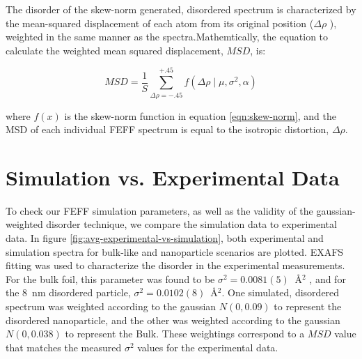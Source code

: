 The disorder of the skew-norm generated, disordered spectrum is characterized by the mean-squared displacement of each atom from its original position ($ \Delta\rho $ ), weighted in the same manner as the spectra.Mathemtically, the equation to calculate the weighted mean squared displacement, $ MSD $, is:

\begin{equation}
	\label{eqn:weighted-MSD}
	MSD  = \frac{1}{S} \sum_{\Delta\rho=-.45}^{+.45} f\left(\Delta \rho \mid \mu, \sigma^2, \alpha \right) 
\end{equation}

\noindent
where $ f(x) $ is the skew-norm function in equation \ref{eqn:skew-norm}, and the MSD of each individual FEFF spectrum is equal to the isotropic distortion, $ \Delta\rho $.  

\section{Simulation vs. Experimental Data}

To check our FEFF simulation parameters, as well as the validity of the gaussian-weighted disorder technique, we compare the simulation data to experimental data. In figure \ref{fig:avg-experimental-vs-simulation}, both experimental and simulation spectra for bulk-like and nanoparticle scenarios are plotted. EXAFS fitting was used to characterize the disorder in the experimental measurements. For the bulk foil, this parameter was found to be $ \sigma^2=0.0081(5)~$ {\AA}$ ^2 $ , and for the 8~nm disordered particle, $ \sigma^2=0.0102(8) $~{\AA}$ ^2 $.  One simulated, disordered spectrum was weighted according to the gaussian $ N(0, 0.09) $ to represent the disordered nanoparticle, and the other was weighted according to the gaussian $ N(0, 0.038)  $ to represent the Bulk. These weightings correspond to a $ MSD $ value that matches the measured $ \sigma^2 $ values for the experimental data.  

